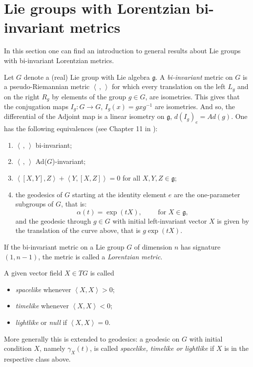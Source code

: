 \documentclass[12pt]{amsart}
\newcommand{\lela}{\left \langle}
\newcommand{\rira}{\right \rangle}
\newcommand{\bil}{\lela\,,\,\rira}
\newcommand{\mgg}{\mathfrak g}
\theoremstyle{plain}
\theoremstyle{definition}
\theoremstyle{remark}
\begin{document}
	
	\section{Lie groups with Lorentzian bi-invariant metrics}\label{section1}
	In this section one can find an introduction to general  results about Lie groups with bi-invariant Lorentzian metrics. 
	
	Let $G$ denote a (real) Lie group with Lie algebra $\mgg$. 
	A \textit{bi-invariant} metric on  $G$ is a pseudo-Riemannian metric $\bil$ for which every translation on the left $L_g$ and on the right $R_g$ by elements of the group $g\in G$, are isometries. This gives that the conjugation maps $I_g: G \to G$, $I_g(x)=gxg^{-1}$ are isometries. And so,  the differential of the Adjoint map is a linear isometry on $\mgg$, $d(I_g)_e= Ad(g)$. One has the following equivalences (see Chapter 11 in \cite{ON}):
	\begin{enumerate}\label{[(i)]}
		\item $\bil$ bi-invariant;
		\item $\bil$ Ad($G$)-invariant;
		\item $\lela [X, Y], Z\rira + \lela Y, [X, Z]\rira= 0$ for all $X, Y, Z \in\mgg$;
		\item the geodesics of $G$ starting at the identity element $e$ are the one-parameter subgroups of $G$, that is:
		\begin{equation}\label{onepara}
			\alpha(t)=\exp(tX), \qquad \mbox{ for }X  \in \mgg, 
		\end{equation}
		and the geodesic through $g\in G$ with initial left-invariant vector $X$ is given by the translation of the curve above, that is $g\exp(tX)$. 
	\end{enumerate}
	If the bi-invariant metric on a Lie group $G$ of dimension $n$ has signature $(1,n-1)$, the metric is called a {\em Lorentzian metric}. 
	
A given vector field  $X\in TG$  is called 
	\begin{itemize}
		\item {\em spacelike} whenever $\lela X,X \rira >0$;
		\item {\em timelike} whenever $\lela X,X \rira < 0$;
		\item {\em lightlike} or {\em null}  if  $\lela X,X \rira = 0$.
	\end{itemize}
More generally this is extended to geodesics: 	a geodesic on $G$ with  initial condition $X$, namely $\gamma_X(t)$, is called {\em spacelike, timelike or lightlike} if $X$ is in the respective class above. 
	
\end{document}
